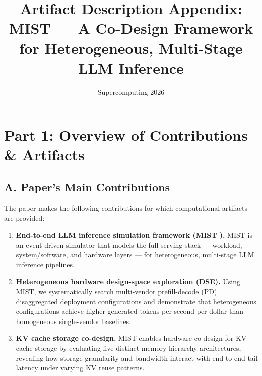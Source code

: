 \documentclass[conference]{IEEEtran}
\newcommand{\tool}{{MIST }}
\newcommand{\toolns}{{MIST}}
\begin{document}
\title{Artifact Description Appendix: MIST --- A Co-Design Framework for
Heterogeneous, Multi-Stage LLM Inference}

\author{\normalsize{Supercomputing 2026}}

\maketitle

\section*{Part 1: Overview of Contributions \& Artifacts}

\subsection*{A. Paper's Main Contributions}

The paper makes the following contributions for which computational
artifacts are provided:

\begin{enumerate}[leftmargin=1.2em]

  \item \textbf{End-to-end LLM inference simulation framework (\tool).}
        \tool is an event-driven simulator that models the full serving
        stack --- workload, system/software, and hardware layers --- for
        heterogeneous, multi-stage LLM inference pipelines.

  \item \textbf{Heterogeneous hardware design-space exploration (DSE).}
        Using \toolns, we systematically search multi-vendor prefill-decode
        (PD) disaggregated deployment configurations and demonstrate that
        heterogeneous configurations achieve higher generated tokens per
        second per dollar than homogeneous single-vendor baselines.

  \item \textbf{KV cache storage co-design.}
        \tool enables hardware co-design for KV cache storage by
        evaluating five distinct memory-hierarchy architectures,
        revealing how storage granularity and bandwidth interact with
        end-to-end tail latency under varying KV reuse patterns.

\end{enumerate}
\end{document}
